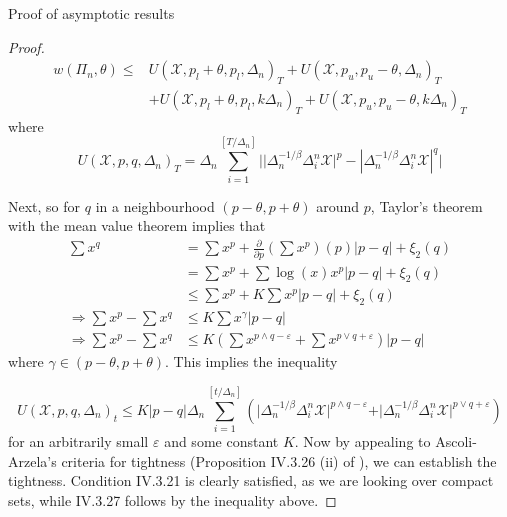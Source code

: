 \documentclass[fleqn,11pt,letterpaper]{article}
\theoremstyle{plain}
\theoremstyle{definition}
\theoremstyle{remark}
\numberwithin{equation}{section}
\begin{document}
\begin{section}{Proof of asymptotic results}
\begin{proof}
\begin{equation}
        \begin{aligned}
            w\left(\Pi_n, \theta\right) \leq & U\left(\mathcal{X}, p_l+\theta, p_l, \Delta_n\right)_T+U\left(\mathcal{X}, p_u, p_u-\theta, \Delta_n\right)_T \\
            & +U\left(\mathcal{X}, p_l+\theta, p_l, k \Delta_n\right)_T+U\left(\mathcal{X}, p_u, p_u-\theta, k \Delta_n\right)_T
        \end{aligned}
    \end{equation}
    where
    \begin{equation}
        U\left(\mathcal{X}, p, q, \Delta_n\right)_T=\Delta_n \sum_{i=1}^{\left[T / \Delta_n\right]}|| \Delta_n^{-1 / \beta} \Delta_i^n \mathcal{X}\vert^p-|\Delta_n^{-1 / \beta} \Delta_i^n \mathcal{X}|^q \vert
    \end{equation}
    
    Next, so for $q$ in a neighbourhood $(p-\theta,p+\theta)$ around $p$, Taylor's theorem with the mean value theorem implies that 
    \begin{equation}
        \begin{split}
            \sum x^q &= \sum x^p + \frac{\partial}{\partial p}\left(\sum x^p\right)(p)\vert p-q\vert + \xi_2(q)\\
            &= \sum x^p + \sum\log(x)x^p\vert p-q\vert + \xi_2(q)\\
            &\leq \sum x^p + K\sum x^p \vert p-q\vert + \xi_2(q)\\
            \Rightarrow \sum x^p - \sum x^q &\leq K\sum x^\gamma \vert p-q\vert\\
            \Rightarrow \sum x^p - \sum x^q &\leq K\left(\sum x^{p\wedge q-\varepsilon} + \sum x^{p\vee q+\varepsilon}\right) \vert p-q\vert
        \end{split}
    \end{equation}
    where $\gamma\in(p-\theta,p+\theta)$. This implies the inequality 

    \begin{equation}
        U(\mathcal{X},p,q,\Delta_n)_t\leq K\vert p-q\vert\Delta_n\sum_{i=1}^{[t/\Delta_n]}\left(\vert\Delta_n^{-1/\beta}\Delta_i^n \mathcal{X}\vert^{p\wedge q-\varepsilon} + \vert \Delta_n^{-1/\beta}\Delta_i^n\mathcal{X}\vert^{p\vee q+\varepsilon}\right)
    \end{equation}
    for an arbitrarily small $\varepsilon$ and some constant $K$. Now by appealing to Ascoli-Arzela's criteria for tightness (Proposition IV.3.26 (ii) of \cite{limitTheorems}), we can establish the tightness. Condition IV.3.21 is clearly satisfied, as we are looking over compact sets, while IV.3.27 follows by the inequality above. 
    

\end{proof}
\end{section}
\end{document}
